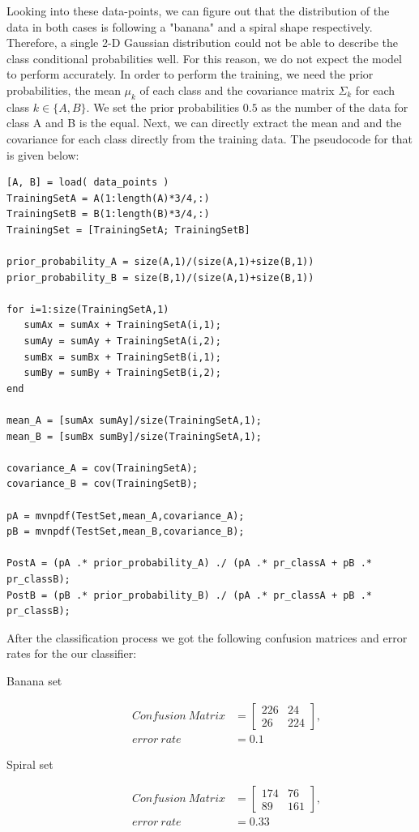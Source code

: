\documentclass[a4paper,11pt]{article}
\begin{document}
Looking into these data-points, we can figure out that the distribution of the data in both cases is following a "banana" and a spiral shape respectively. Therefore, a single 2-D Gaussian distribution could not be able to describe the class conditional probabilities well. For this reason, we do not expect the model to perform accurately. In order to perform the training, we need the prior probabilities, the mean $\mu_k$ of each class and the covariance matrix $\Sigma_k$  for each class $k \in \{A, B\}$. We set the prior probabilities $0.5$ as the number of the data for class A and B is the equal. Next, we can directly extract the mean and and the covariance for each class directly from the training data. The pseudocode for that is given below:\\

\begin{verbatim}
[A, B] = load( data_points )
TrainingSetA = A(1:length(A)*3/4,:)
TrainingSetB = B(1:length(B)*3/4,:)
TrainingSet = [TrainingSetA; TrainingSetB]

prior_probability_A = size(A,1)/(size(A,1)+size(B,1))
prior_probability_B = size(B,1)/(size(A,1)+size(B,1))

for i=1:size(TrainingSetA,1)
   sumAx = sumAx + TrainingSetA(i,1);
   sumAy = sumAy + TrainingSetA(i,2);
   sumBx = sumBx + TrainingSetB(i,1);
   sumBy = sumBy + TrainingSetB(i,2);
end

mean_A = [sumAx sumAy]/size(TrainingSetA,1);
mean_B = [sumBx sumBy]/size(TrainingSetA,1);

covariance_A = cov(TrainingSetA);
covariance_B = cov(TrainingSetB);

pA = mvnpdf(TestSet,mean_A,covariance_A);
pB = mvnpdf(TestSet,mean_B,covariance_B);

PostA = (pA .* prior_probability_A) ./ (pA .* pr_classA + pB .* pr_classB);
PostB = (pB .* prior_probability_B) ./ (pA .* pr_classA + pB .* pr_classB);
\end{verbatim} 
After the classification process we got the following confusion matrices and error rates for the our classifier:
\begin{description}
\item[Banana set]
\begin{align*}
Confusion\ Matrix &= 
\begin{bmatrix}
226 & 24 \\ 
26 & 224
\end{bmatrix},\\
error\ rate &= 0.1
\end{align*}
\item[Spiral set]
\begin{align*}
Confusion\ Matrix &= 
\begin{bmatrix}
174 & 76 \\ 
89 & 161
\end{bmatrix},\\
error\ rate &= 0.33
\end{align*}
\end{description}
\end{document}
